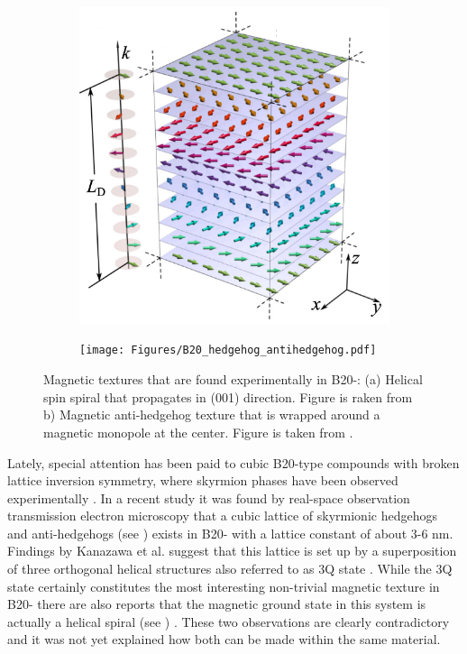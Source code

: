 \documentclass [a4paper, 12pt]{article}
\begin{document}
\begin{figure}[h]
\centering
\begin{subfigure}[b]{0.49\textwidth}
   \includegraphics[width=\textwidth]{Figures/helicalspiral.png}
   \caption{}
   \label{fig:mnge_spiral}
\end{subfigure}
\begin{subfigure}[b]{0.49\textwidth}
	\texttt{[image: Figures/B20\_hedgehog\_antihedgehog.pdf]}
   \caption{}
   \label{fig:mnge_3q}
\end{subfigure}
	\caption{Magnetic textures that are found experimentally in B20-:  (a) Helical
	spin spiral that propagates in (001) direction. Figure is raken from \cite{rybakov_new_2016} b) 
	Magnetic anti-hedgehog texture that is wrapped around a magnetic monopole at the center. Figure is taken from \cite{zhang_electric_2016}.}
\label{fig:mnge_spiral_and_3q}
\end{figure}



Lately, special attention has been paid to cubic B20-type compounds with broken lattice inversion symmetry,
where skyrmion phases have been observed experimentally \cite{nagaosa_topological_2013}.
In a recent study \cite{tanigaki_real-space_2015} it was 
found by real-space observation transmission electron microscopy that a cubic lattice of skyrmionic hedgehogs
and anti-hedgehogs (see ) exists in B20- 
with a lattice constant of about 3-6 nm.
Findings by Kanazawa et al. suggest that this lattice is set up by a superposition of three orthogonal
helical structures also referred to as 3Q state \cite{kanazawa_noncentrosymmetric_2017}. 
While the 3Q state certainly constitutes the most interesting non-trivial magnetic texture 
in B20- there are also reports that the magnetic ground state in this system is
actually a helical spiral (see ) \cite{yaouanc_magnetic_2017}.
These two observations are clearly contradictory and it was not yet explained how
both can be made within the same material.
\end{document}
